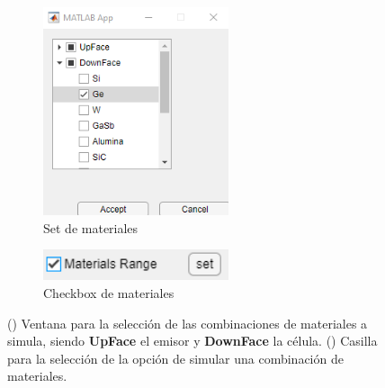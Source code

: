 	\begin{figure}[H]%
	\begin{subfigure}[b]{0.48\textwidth}
		\centering
			\includegraphics[width=0.6\textwidth]{figuras/Procedimiento_Simulaciones/Radiacion/set_materilas2.png}
		\caption{Set de materiales}
		\label{fig:set_materials2}
	\end{subfigure}\hfill
		\begin{subfigure}[b]{0.48\textwidth}
		\centering
			\includegraphics[width=0.6\textwidth]{figuras/Procedimiento_Simulaciones/Radiacion/check_materials2.png}
		\caption{Checkbox de materiales}
		\label{fig:check_materials2}
	\end{subfigure}
	\caption{() Ventana para la selección de las combinaciones de materiales a simula, siendo \textbf{UpFace} el emisor y \textbf{DownFace} la célula.	() Casilla para la selección de la opción de simular una combinación de materiales.}%
	\label{fig:sets2}%
	\end{figure}	
